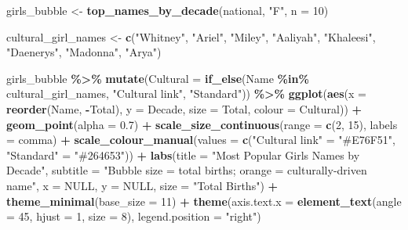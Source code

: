\documentclass[
]{article}
\newenvironment{Shaded}{\begin{snugshade}}{\end{snugshade}}
\newcommand{\AttributeTok}[1]{\textcolor[rgb]{0.13,0.29,0.53}{#1}}
\newcommand{\ConstantTok}[1]{\textcolor[rgb]{0.56,0.35,0.01}{#1}}
\newcommand{\DecValTok}[1]{\textcolor[rgb]{0.00,0.00,0.81}{#1}}
\newcommand{\FloatTok}[1]{\textcolor[rgb]{0.00,0.00,0.81}{#1}}
\newcommand{\FunctionTok}[1]{\textcolor[rgb]{0.13,0.29,0.53}{\textbf{#1}}}
\newcommand{\NormalTok}[1]{#1}
\newcommand{\OtherTok}[1]{\textcolor[rgb]{0.56,0.35,0.01}{#1}}
\newcommand{\SpecialCharTok}[1]{\textcolor[rgb]{0.81,0.36,0.00}{\textbf{#1}}}
\newcommand{\StringTok}[1]{\textcolor[rgb]{0.31,0.60,0.02}{#1}}
\begin{document}
\begin{Shaded}
\begin{Highlighting}[]
\NormalTok{girls\_bubble }\OtherTok{\textless{}{-}} \FunctionTok{top\_names\_by\_decade}\NormalTok{(national, }\StringTok{"F"}\NormalTok{, }\AttributeTok{n =} \DecValTok{10}\NormalTok{)}

\NormalTok{cultural\_girl\_names }\OtherTok{\textless{}{-}} \FunctionTok{c}\NormalTok{(}\StringTok{"Whitney"}\NormalTok{, }\StringTok{"Ariel"}\NormalTok{, }\StringTok{"Miley"}\NormalTok{, }\StringTok{"Aaliyah"}\NormalTok{,}
                          \StringTok{"Khaleesi"}\NormalTok{, }\StringTok{"Daenerys"}\NormalTok{, }\StringTok{"Madonna"}\NormalTok{, }\StringTok{"Arya"}\NormalTok{)}

\NormalTok{girls\_bubble }\SpecialCharTok{\%\textgreater{}\%}
    \FunctionTok{mutate}\NormalTok{(}\AttributeTok{Cultural =} \FunctionTok{if\_else}\NormalTok{(Name }\SpecialCharTok{\%in\%}\NormalTok{ cultural\_girl\_names, }\StringTok{"Cultural link"}\NormalTok{, }\StringTok{"Standard"}\NormalTok{)) }\SpecialCharTok{\%\textgreater{}\%}
    \FunctionTok{ggplot}\NormalTok{(}\FunctionTok{aes}\NormalTok{(}\AttributeTok{x =} \FunctionTok{reorder}\NormalTok{(Name, }\SpecialCharTok{{-}}\NormalTok{Total), }\AttributeTok{y =}\NormalTok{ Decade, }\AttributeTok{size =}\NormalTok{ Total, }\AttributeTok{colour =}\NormalTok{ Cultural)) }\SpecialCharTok{+}
    \FunctionTok{geom\_point}\NormalTok{(}\AttributeTok{alpha =} \FloatTok{0.7}\NormalTok{) }\SpecialCharTok{+}
    \FunctionTok{scale\_size\_continuous}\NormalTok{(}\AttributeTok{range =} \FunctionTok{c}\NormalTok{(}\DecValTok{2}\NormalTok{, }\DecValTok{15}\NormalTok{), }\AttributeTok{labels =}\NormalTok{ comma) }\SpecialCharTok{+}
    \FunctionTok{scale\_colour\_manual}\NormalTok{(}\AttributeTok{values =} \FunctionTok{c}\NormalTok{(}\StringTok{"Cultural link"} \OtherTok{=} \StringTok{"\#E76F51"}\NormalTok{, }\StringTok{"Standard"} \OtherTok{=} \StringTok{"\#264653"}\NormalTok{)) }\SpecialCharTok{+}
    \FunctionTok{labs}\NormalTok{(}\AttributeTok{title =} \StringTok{"Most Popular Girls\textquotesingle{} Names by Decade"}\NormalTok{,}
         \AttributeTok{subtitle =} \StringTok{"Bubble size = total births; orange = culturally{-}driven name"}\NormalTok{,}
         \AttributeTok{x =} \ConstantTok{NULL}\NormalTok{, }\AttributeTok{y =} \ConstantTok{NULL}\NormalTok{, }\AttributeTok{size =} \StringTok{"Total Births"}\NormalTok{) }\SpecialCharTok{+}
    \FunctionTok{theme\_minimal}\NormalTok{(}\AttributeTok{base\_size =} \DecValTok{11}\NormalTok{) }\SpecialCharTok{+}
    \FunctionTok{theme}\NormalTok{(}\AttributeTok{axis.text.x =} \FunctionTok{element\_text}\NormalTok{(}\AttributeTok{angle =} \DecValTok{45}\NormalTok{, }\AttributeTok{hjust =} \DecValTok{1}\NormalTok{, }\AttributeTok{size =} \DecValTok{8}\NormalTok{),}
          \AttributeTok{legend.position =} \StringTok{"right"}\NormalTok{)}
\end{Highlighting}
\end{Shaded}
\end{document}
